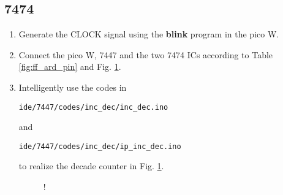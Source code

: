 \documentclass[journal]{IEEEtran}
\begin{document}
\subsection{7474}
\begin{enumerate}[label=\arabic*.,ref=\theenumi]
\item
Generate the CLOCK signal using the \textbf{blink} program in the pico W. 
\item
Connect the pico W, 7447 and the two 7474 ICs according to Table \ref{fig:ff_ard_pin} and Fig. \ref{fig:decade_counter}.

			\begin{table}[H]
\centering

\caption{}
\label{fig:ff_ard_pin}
\end{table}
%
\item
Intelligently use the codes in 
\begin{lstlisting}
ide/7447/codes/inc_dec/inc_dec.ino
\end{lstlisting}
and
\begin{lstlisting}
ide/7447/codes/inc_dec/ip_inc_dec.ino
\end{lstlisting}
to realize the decade counter in Fig. \ref{fig:decade_counter}.
% 
 \begin{figure}[H]
\begin{center}
\resizebox {0.5\columnwidth} {!} {

}
\end{center}
\caption{}
\label{fig:decade_counter}
\end{figure}
%
\end{enumerate}
\end{document}

